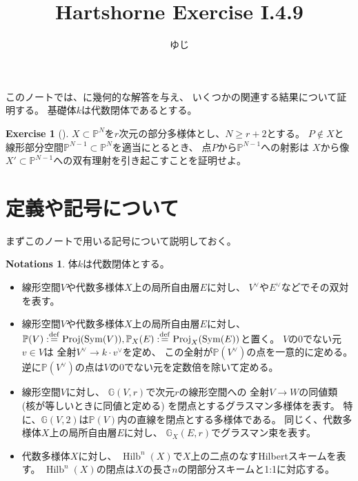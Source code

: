\documentclass[uplatex]{jsarticle}
\title{Hartshorne Exercise I.4.9}
\author{ゆじ}
\theoremstyle{definition}
\newtheorem*{notation*}{Notations}
\newtheorem*{Ex*}{Exercise}
\DeclareMathOperator{\Proj}{\mathrm{Proj}}
\DeclareMathOperator{\Sym}{\mathrm{Sym}}
\DeclareMathOperator{\Hilb}{\mathrm{Hilb}}
\newcommand{\G}{\mathbb{G}}
\renewcommand{\P}{\mathbb{P}}
\newcommand{\dfn}{:\overset{\mathrm{\scriptsize def}}{=}}
\begin{document}
\maketitle


このノートでは、\cite[演習 I.4.9]{Ha}に幾何的な解答を与え、
いくつかの関連する結果について証明する。
基礎体\(k\)は代数閉体であるとする。


\begin{Ex*}[{\cite[演習 I.4.9]{Ha}}]
  \(X\subset \P^N\)を\(r\)次元の部分多様体とし、\(N\geq r+2\)とする。
  \(P\not\in X\)と線形部分空間\(\P^{N-1}\subset \P^N\)を適当にとるとき、
  点\(P\)から\(\P^{N-1}\)への射影は
  \(X\)から像\(X'\subset \P^{N-1}\)への双有理射を引き起こすことを証明せよ。
\end{Ex*}


\section{定義や記号について}



まずこのノートで用いる記号について説明しておく。

\begin{notation*}
  体\(k\)は代数閉体とする。
  \begin{itemize}
    \item
    線形空間\(V\)や代数多様体\(X\)上の局所自由層\(E\)に対し、
    \(V^{\vee}\)や\(E^{\vee}\)などでその双対を表す。
    \item
    線形空間\(V\)や代数多様体\(X\)上の局所自由層\(E\)に対し、
    \(\P(V)\dfn \Proj(\Sym(V)) , \P_X(E)\dfn \Proj_X(\Sym(E))\)と置く。
    \(V\)の\(0\)でない元\(v\in V\)は
    全射\(V^{\vee}\to k\cdot v^{\vee}\)を定め、
    この全射が\(\P(V^{\vee})\)の点を一意的に定める。
    逆に\(\P(V^{\vee})\)の点は\(V\)の\(0\)でない元を定数倍を除いて定める。
    \item
    線形空間\(V\)に対し、
    \(\G(V,r)\)で次元\(r\)の線形空間への
    全射\(V\to W\)の同値類 (核が等しいときに同値と定める)
    を閉点とするグラスマン多様体を表す。
    特に、\(\G(V,2)\)は\(\P(V)\)内の直線を閉点とする多様体である。
    同じく、代数多様体\(X\)上の局所自由層\(E\)に対し、
    \(\G_X(E,r)\)でグラスマン束を表す。
    \item
    代数多様体\(X\)に対し、
    \(\Hilb^n(X)\)で\(X\)上の二点のなすHilbertスキームを表す。
    \(\Hilb^n(X)\)の閉点は\(X\)の長さ\(n\)の閉部分スキームと1:1に対応する。
  \end{itemize}
\end{notation*}
\end{document}
